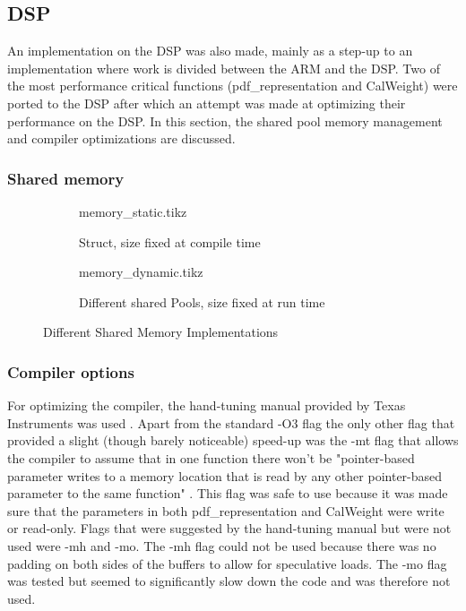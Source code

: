 \documentclass[final]{article}
\begin{document}
\subsection{DSP}
An implementation on the DSP was also made, mainly as a step-up to an implementation where work is divided between the ARM and the DSP.
Two of the most performance critical functions (pdf\_representation and CalWeight) were ported to the DSP after which an attempt was made at optimizing their performance on the DSP.
In this section, the shared pool memory management and compiler optimizations are discussed.

\subsubsection{Shared memory}

\begin{figure}[H]
    \centering
    \begin{subfigure}[b]{0.45\linewidth}
        \centering
        {memory_static.tikz}
        \caption{Struct, size fixed at compile time}
        \label{fig:memory-static}
    \end{subfigure}
    \begin{subfigure}[b]{0.45\linewidth}
        \centering
        {memory_dynamic.tikz}
        \caption{Different shared Pools, size fixed at run time}
        \label{fig:memory-dynamic}
    \end{subfigure}
    \caption{Different Shared Memory Implementations}
    \label{fig:memory}
\end{figure}


\subsubsection{Compiler options}
For optimizing the compiler, the hand-tuning manual provided by Texas Instruments was used \cite{handtuning}.
Apart from the standard -O3 flag the only other flag that provided a slight (though barely noticeable) speed-up was the -mt flag that allows the compiler to assume that in one function there won't be "pointer-based parameter writes to a memory location that is read by any other pointer-based parameter to the same function" \cite{handtuning}.
This flag was safe to use because it was made sure that the parameters in both pdf\_representation and CalWeight were write or read-only. Flags that were suggested by the hand-tuning manual but were not used were -mh and -mo. The -mh flag could not be used because there was no padding on both sides of the buffers to allow for speculative loads. The -mo flag was tested but seemed to significantly slow down the code and was therefore not used.
\end{document}
